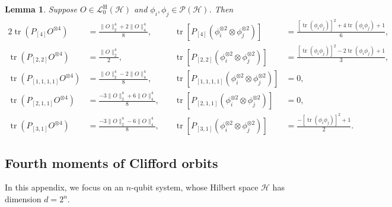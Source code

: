 \documentclass[aps,pra,twocolumn,nofootinbib,superscriptaddress,10pt]{revtex4-2}
\newtheorem{lemma}{Lemma}
\DeclareMathOperator{\tr}{tr}
\newcommand{\caH}{\mathcal{H}}
\newcommand{\caL}{\mathcal{L}}
\newcommand{\caP}{\mathcal{P}}
\newcommand{\rmH}{\mathrm{H}}
\begin{document}
\begin{lemma}
\label{lem:moment_tr}
Suppose $O \in \caL^{\rmH}_0(\caH)$ and $\phi_i, \phi_j \in \caP(\caH)$. Then
    \begin{alignat}{2}
        \tr\left( P_{[4]} O^{\otimes 4}\right)&=\frac{\|O\|_2^4+2\|O\|_4^4}{8},&\quad  \tr\left[P_{[4]} \left(\phi_i^{\otimes 2}\otimes\phi_j^{\otimes 2}\right)\right]&=\frac{\left[\tr(\phi_i\phi_j)\right]^2+4\tr(\phi_i\phi_j)+1}{6}, \nonumber\\
        \tr\left( P_{[2,2]} O^{\otimes 4}\right)&=\frac{\|O\|_2^4}{2},&\quad   \tr\left[ P_{[2,2]} \left(\phi_i^{\otimes 2}\otimes\phi_j^{\otimes 2}\right)\right]&=\frac{\left[\tr(\phi_i\phi_j)\right]^2-2\tr(\phi_i\phi_j)+1}{3}, \nonumber\\
        \tr\left( P_{[1,1,1,1]} O^{\otimes 4}\right)&=\frac{\|O\|_2^4-2\|O\|_4^4}{8},&\quad\tr\left[ P_{[1,1,1,1]} \left(\phi_i^{\otimes 2}\otimes\phi_j^{\otimes 2}\right)\right]&=0,\\
        \tr\left( P_{[2,1,1]} O^{\otimes 4}\right)&=\frac{-3\|O\|_2^4+6\|O\|_4^4}{8},&\quad \tr\left[ P_{[2,1,1]}\left(\phi_i^{\otimes 2}\otimes\phi_j^{\otimes 2}\right)\right]&=0, \nonumber\\
        \tr\left( P_{[3,1]} O^{\otimes 4}\right)&=\frac{-3\|O\|_2^4-6\|O\|_4^4}{8},&\quad\tr\left[ P_{[3,1]}\left(\phi_i^{\otimes 2}\otimes\phi_j^{\otimes 2}\right)\right]&=\frac{-\left[\tr(\phi_i\phi_j)\right]^2+1}{2}.\nonumber
    \end{alignat}
\end{lemma}

\subsection{Fourth moments of Clifford orbits}
In this appendix, we focus on an $n$-qubit system, whose Hilbert space $\caH$ has dimension $d = 2^n$.
\end{document}
